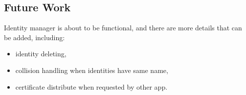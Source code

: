 \documentclass[a0,portrait]{poster}
\begin{document}
\begin{multicols}{2}


\section*{Future Work}

\par 
	Identity manager is about to be functional, and there are more details that can be added, including:
	\begin{itemize}
		\item identity deleting, 
		\item collision handling when identities have same name,
		\item certificate distribute when requested by other app.
	\end{itemize} 


\nocite{*} %




\end{multicols}
\end{document}
